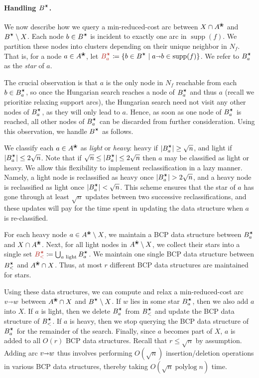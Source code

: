 \documentclass[11pt]{article}
\def\polylog{\mathop{\mathrm{polylog}}}
\def\abs#1{\mathopen| #1 \mathclose|}		%
\def\arcto{\mathord\shortrightarrow}
\def\arc#1#2{#1\arcto#2}
\def\supp{\operatorname{supp}}
\def\alive#1{{#1}^\text{\ding{96}}}
\def\star{\text{\ding{84}}}
\theoremstyle{plain}
\numberwithin{figure}{section}
\def\EMPH#1{\textcolor{BrickRed}{{\emph{#1}}}}
\begin{document}
\paragraph*{Handling $B^\star$.}
We now describe how we query a min-reduced-cost arc between $X \cap \alive{A}$
and $B^\star \setminus X$.
Each node $b \in B^\star$ is incident to exactly one arc in
$\supp(f)$.
We partition these nodes into clusters depending on their unique neighbor in $N_f$.
That is, for a node $a \in \alive{A}$,
let $\EMPH{$B_a^\star$} \coloneqq \{b \in B^\star \mid {\arc ab} \in \supp(f)\}$.
We refer to $B_a^\star$ as the \EMPH{star} of $a$.

The crucial observation is that $a$ is the only node in $N_f$ reachable from
each $b \in B_a^\star$, so once the Hungarian search reaches a node of $B_a^\star$ and thus
$a$ (recall we prioritize relaxing support arcs), the Hungarian search need
not visit any other nodes of $B_a^\star$, as they will only lead to $a$.
Hence, as soon as one node of $B_a^\star$ is reached, all other nodes of $B_a^\star$ can be
discarded from further consideration.
Using this observation, we handle $B^\star$ as follows.

We classify each $a \in \alive{A}$ as \EMPH{light} or \EMPH{heavy}:
heavy if $\abs{B_a^\star} \geq \sqrt{n}$,
and light if $\abs{B_a^\star} \leq 2\sqrt{n}$.
Note that if $\sqrt{n} \leq \abs{B_a^\star} \leq 2\sqrt{n}$ then $a$ may be classified
as light or heavy.
We allow this flexibility to implement reclassification in a lazy manner.
Namely, a light node is reclassified as heavy once $\abs{B_a^\star} > 2\sqrt{n}$,
and a heavy node is reclassified as light once $\abs{B_a^\star} < \sqrt{n}$.
This scheme ensures that the star of $a$ has gone through at least $\sqrt{n}$
updates between two successive reclassifications,
and these updates will pay for the time spent in updating the data structure
when $a$ is re-classified.

For each heavy node $a \in \alive{A} \setminus X$, we maintain a BCP data
structure between $B_a^\star$ and $X \cap \alive{A}$.
Next, for all light nodes in $\alive{A} \setminus X$, we collect their stars into
a single set $\EMPH{$B_<^\star$} \coloneqq \bigcup_{\text{$a$ light}} B_a^\star$.
We maintain one single BCP data structure between $B_<^\star$ and $\alive{A} \cap X$.
Thus, at most $r$ different BCP data structures are maintained for stars.

Using these data structures, we can compute and relax a min-reduced-cost arc $\arc vw$ between
$\alive{A} \cap X$ and $B^\star \setminus X$.
If $w$ lies in some star $B_a^\star$, then we also add $a$ into $X$.
If $a$ is light, then we delete $B_a^\star$ from $B_<^\star$ and update the BCP data structure of $B_<^\star$.
If $a$ is heavy, then we stop querying the BCP data structure of $B_a^\star$ for the
remainder of the search.
Finally, since $a$ becomes part of $X$, $a$ is added to all $O(r)$ BCP data structures.
%
Recall that $r \leq \sqrt{n}$ by assumption.
Adding arc $\arc vw$ thus involves performing $O(\sqrt{n})$
insertion/deletion operations in various BCP data structures, thereby taking
$O(\sqrt{n}\polylog n)$ time.
\end{document}
